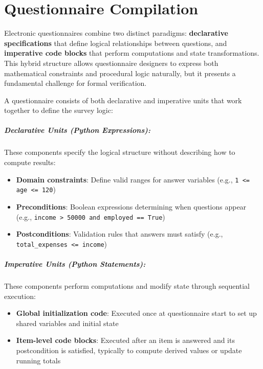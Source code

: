 \chapter{Questionnaire Compilation}
\label{ch:compilation}

Electronic questionnaires combine two distinct paradigms: \textbf{declarative specifications} that define logical relationships between questions, and \textbf{imperative code blocks} that perform computations and state transformations. This hybrid structure allows questionnaire designers to express both mathematical constraints and procedural logic naturally, but it presents a fundamental challenge for formal verification.

A questionnaire consists of both declarative and imperative units that work together to define the survey logic:

\paragraph{Declarative Units (Python Expressions):}
These components specify the logical structure without describing how to compute results:
\begin{itemize}
    \item \textbf{Domain constraints}: Define valid ranges for answer variables (e.g., \texttt{1 <= age <= 120})
    \item \textbf{Preconditions}: Boolean expressions determining when questions appear (e.g., \texttt{income > 50000 and employed == True})
    \item \textbf{Postconditions}: Validation rules that answers must satisfy (e.g., \texttt{total\_expenses <= income})
\end{itemize}

\paragraph{Imperative Units (Python Statements):}
These components perform computations and modify state through sequential execution:
\begin{itemize}
    \item \textbf{Global initialization code}: Executed once at questionnaire start to set up shared variables and initial state
    \item \textbf{Item-level code blocks}: Executed after an item is answered and its postcondition is satisfied, typically to compute derived values or update running totals
\end{itemize}

